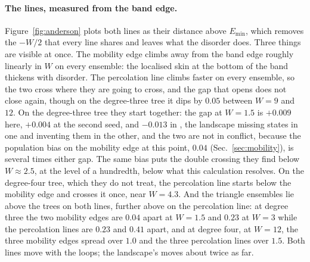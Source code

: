 \paragraph{The lines, measured from the band edge.}
Figure~\ref{fig:anderson} plots both lines as their distance above
$E_{\min}$, which removes the $-W/2$ that every line shares and leaves what
the disorder does. Three things are visible at once. The mobility edge
climbs away from the band edge roughly linearly in $W$ on every ensemble:
the localised skin at the bottom of the band thickens with disorder. The
percolation line climbs faster on every ensemble, so the two cross where
they are going to cross, and the gap that opens does not close again,
though on the degree-three tree it dips by $0.05$ between $W=9$ and $12$. On the degree-three tree they start together: the gap at $W=1.5$ is $+0.009$ here, $+0.004$ at the second seed, and $-0.013$ in \citeauthor{tonetti2026}, the landscape
missing states in one and inventing them in the other, and the two are
not in conflict, because the population bias on the mobility edge at
this point, $0.04$ (Sec.~\ref{sec:mobility}), is several times either
gap. The same bias puts the double crossing they find below
$W\approx2.5$, at the level of a hundredth, below what this calculation
resolves. On
the degree-four tree, which they do not treat, the percolation line
starts below the mobility edge and crosses it once, near $W=4.3$. And the
triangle ensembles lie above the trees on both lines, further above on
the percolation line: at degree three the two mobility edges are $0.04$ apart at $W=1.5$ and $0.23$ at $W=3$ while the percolation lines are $0.23$ and $0.41$ apart, and at degree four, at $W=12$, the three mobility edges spread over $1.0$ and the three percolation lines over $1.5$. Both lines
move with the loops; the landscape's moves about twice as far.

